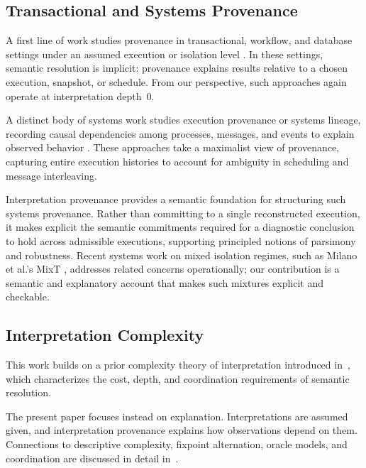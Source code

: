 \documentclass[acmsmall,nonacm]{acmart}
\theoremstyle{remark}
\numberwithin{definition}{section}
\numberwithin{theorem}{section}
\numberwithin{lemma}{section}
\numberwithin{corollary}{section}
\numberwithin{remark}{section}
\numberwithin{example}{section}
\numberwithin{observation}{section}
\numberwithin{assumption}{section}
\begin{document}
\subsection{Transactional and Systems Provenance}

A first line of work studies provenance in transactional, workflow, and database
settings under an assumed execution or isolation level
\cite{bernstein1987concurrency,adya1999weak,cerone2015consistency,cheney2009provenance,freire2008provenance}.
In these settings, semantic resolution is implicit: provenance explains results
relative to a chosen execution, snapshot, or schedule.
From our perspective, such approaches again operate at interpretation depth~0.

A distinct body of systems work studies execution provenance or systems lineage,
recording causal dependencies among processes, messages, and events to explain
observed behavior
\cite{seltzer2005provenance,bates2015trustworthy,sigelman2010dapper}.
These approaches take a maximalist view of provenance, capturing entire execution
histories to account for ambiguity in scheduling and message interleaving.

Interpretation provenance provides a semantic foundation for structuring such
systems provenance.
Rather than committing to a single reconstructed execution, it makes explicit
the semantic commitments required for a diagnostic conclusion to hold across
admissible executions, supporting principled notions of parsimony and robustness.
Recent systems work on mixed isolation regimes, such as Milano et al.’s MixT
\cite{milano2020mixt}, addresses related concerns operationally; our contribution
is a semantic and explanatory account that makes such mixtures explicit and
checkable.

\subsection{Interpretation Complexity}

This work builds on a prior complexity theory of interpretation
introduced in~\cite{hellerstein2026interpretation}, which characterizes the cost,
depth, and coordination requirements of semantic resolution.

The present paper focuses instead on explanation.
Interpretations are assumed given, and interpretation provenance explains how
observations depend on them.
Connections to descriptive complexity, fixpoint alternation, oracle models, and
coordination are discussed in detail in~\cite{hellerstein2026interpretation}.
\end{document}
